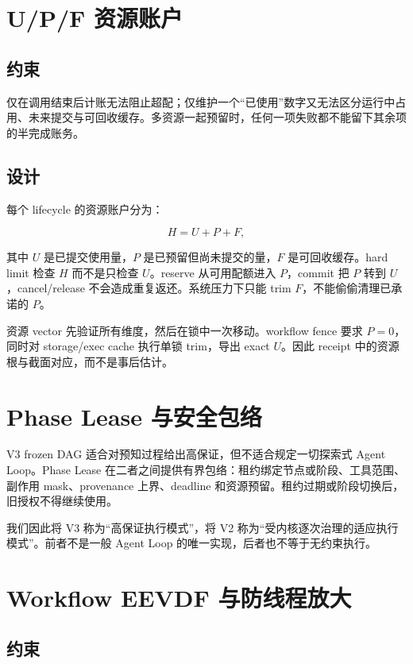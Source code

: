 \section{U/P/F 资源账户}

\subsection{约束}

仅在调用结束后计账无法阻止超配；仅维护一个“已使用”数字又无法区分运行中占用、未来提交与可回收缓存。多资源一起预留时，任何一项失败都不能留下其余项的半完成账务。

\subsection{设计}

每个 lifecycle 的资源账户分为：

\begin{equation}
  H = U + P + F,
\end{equation}

其中 $U$ 是已提交使用量，$P$ 是已预留但尚未提交的量，$F$ 是可回收缓存。hard limit 检查 $H$ 而不是只检查 $U$。reserve 从可用配额进入 $P$，commit 把 $P$ 转到 $U$，cancel/release 不会造成重复返还。系统压力下只能 trim $F$，不能偷偷清理已承诺的 $P$。

资源 vector 先验证所有维度，然后在锁中一次移动。workflow fence 要求 $P=0$，同时对 storage/exec cache 执行单锁 trim，导出 exact $U$。因此 receipt 中的资源根与截面对应，而不是事后估计。

\section{Phase Lease 与安全包络}

V3 frozen DAG 适合对预知过程给出高保证，但不适合规定一切探索式 Agent Loop。Phase Lease 在二者之间提供有界包络：租约绑定节点或阶段、工具范围、副作用 mask、provenance 上界、deadline 和资源预留。租约过期或阶段切换后，旧授权不得继续使用。

我们因此将 V3 称为“高保证执行模式”，将 V2 称为“受内核逐次治理的适应执行模式”。前者不是一般 Agent Loop 的唯一实现，后者也不等于无约束执行。

\section{Workflow EEVDF 与防线程放大}

\subsection{约束}


